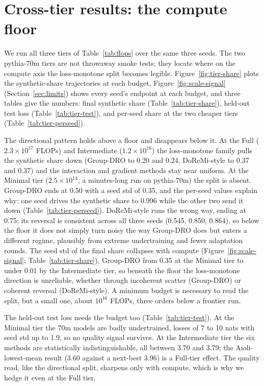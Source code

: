 \documentclass{article}
\begin{document}
\section{Cross-tier results: the compute floor}
\label{app:tiers}

We run all three tiers of Table~\ref{tab:flops} over the same three seeds. The two pythia-70m tiers are not throwaway smoke tests; they locate where on the compute axis the loss-monotone split becomes legible. Figure~\ref{fig:tier-share} plots the synthetic-share trajectories at each budget, Figure~\ref{fig:scale-signal} (Section~\ref{sec:limits}) shows every seed's endpoint at each budget, and three tables give the numbers: final synthetic share (Table~\ref{tab:tier-share}), held-out test loss (Table~\ref{tab:tier-test}), and per-seed share at the two cheaper tiers (Table~\ref{tab:tier-perseed}).

The directional pattern holds above a floor and disappears below it. At the Full ($2.3\times10^{17}$ FLOPs) and Intermediate ($1.2\times10^{16}$) the loss-monotone family pulls the synthetic share down (Group-DRO to 0.20 and 0.24, DoReMi-style to 0.37 and 0.37) and the interaction and gradient methods stay near uniform. At the Minimal tier ($2.5\times10^{14}$, a minutes-long run on pythia-70m) the split is absent. Group-DRO ends at 0.50 with a seed std of 0.35, and the per-seed values explain why: one seed drives the synthetic share to 0.996 while the other two send it down (Table~\ref{tab:tier-perseed}). DoReMi-style runs the wrong way, ending at 0.75; its reversal is consistent across all three seeds (0.545, 0.850, 0.864), so below the floor it does not simply turn noisy the way Group-DRO does but enters a different regime, plausibly from extreme undertraining and fewer adaptation rounds. The seed std of the final share collapses with compute (Figure~\ref{fig:scale-signal}; Table~\ref{tab:tier-share}), Group-DRO from 0.35 at the Minimal tier to under 0.01 by the Intermediate tier, so beneath the floor the loss-monotone direction is unreliable, whether through incoherent scatter (Group-DRO) or coherent reversal (DoReMi-style). A minimum budget is necessary to read the split, but a small one, about $10^{16}$ FLOPs, three orders below a frontier run.

The held-out test loss needs the budget too (Table~\ref{tab:tier-test}). At the Minimal tier the 70m models are badly undertrained, losses of 7 to 10 nats with seed std up to 1.9, so no quality signal survives. At the Intermediate tier the six methods are statistically indistinguishable, all between 3.70 and 3.79; the Aioli-lowest-mean result (3.60 against a next-best 3.96) is a Full-tier effect. The quality read, like the directional split, sharpens only with compute, which is why we hedge it even at the Full tier.
\end{document}
